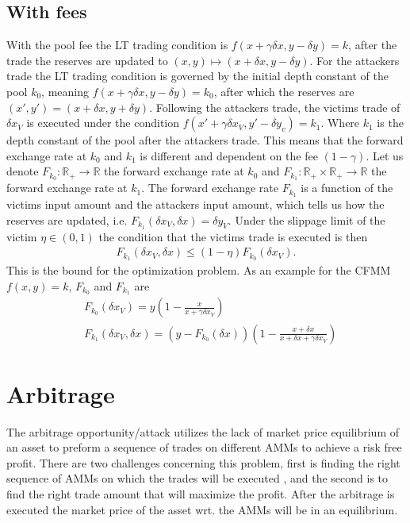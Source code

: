 \subsection{With fees}
With the pool fee the LT trading condition is $f(x+\gamma \delta x, y - \delta y) =
k$, after the trade the reserves are updated to $(x, y) \mapsto (x + \delta x, y - \delta
y)$. For the attackers trade the LT trading condition is governed by the
initial depth constant of the pool $k_0$, meaning $f\left(x+\gamma \delta x,
y - \delta y\right) = k_0$, after which the reserves are $(x', y') =
(x+\delta x, y+\delta y)$. Following the attackers trade, the victims trade
of $\delta x_V$ is executed under the condition $f(x' + \gamma \delta x_V, y'
- \delta y_v) = k_1$. Where $k_1$ is the depth constant of the pool after the
attackers trade. This means that the forward exchange rate at $k_0$ and $k_1$
is different and dependent on the fee $(1-\gamma)$. Let us denote $F_{k_0}:
\mathbb{R}_+ \to \mathbb{R}$ the forward exchange rate at $k_0$ and $F_{k_1}:
\mathbb{R}_+ \times \mathbb{R}_+ \to \mathbb{R}$  the forward exchange rate
at $k_1$. The forward exchange rate $F_{k_1}$ is a function of the victims
input amount and the attackers input amount, which tells us how the reserves
are updated, i.e. $F_{k_1}(\delta x_V, \delta x) = \delta y_V$. Under the slippage
limit of the victim $\eta \in (0,1)$ the condition that the victims trade is
executed is then
\begin{align}
    F_{k_1}(\delta x_V, \delta x) \le (1-\eta)F_{k_0}(\delta x_V).
\end{align}
This is the bound for the optimization problem. As an example for the CFMM
$f(x,y) = k$, $F_{k_0}$ and $F_{k_1}$ are
\begin{align}
    &F_{k_0}(\delta x_V) = y \left(1-\frac{x}{x+\gamma \delta x_V}\right) \\
    &F_{k_1}(\delta x_V, \delta x) = \left(y - F_{k_0}(\delta x)\right)
    \left(1-\frac{x+\delta x}{x + \delta x +\gamma \delta x_V}\right)
\end{align}
\section{Arbitrage}
The arbitrage opportunity/attack utilizes the lack of market price
equilibrium of an asset to preform a sequence of trades on different AMMs to
achieve a risk free profit. There are two challenges concerning this problem,
first is finding the right sequence of AMMs on which the trades will be
executed , and the second is to find the right trade amount that will
maximize the profit. After the arbitrage is executed the market price of the
asset wrt. the AMMs will be in an equilibrium.
